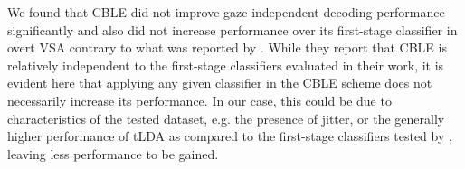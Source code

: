 

We found that CBLE did not improve gaze-independent decoding performance
significantly and also did not increase performance over its first-stage
classifier in overt VSA contrary to what was reported
by \cite{Mowla2017}.
While they report that CBLE is relatively independent to the
first-stage classifiers evaluated in their work, it is evident here that
applying any given classifier in the CBLE scheme does not necessarily increase
its performance.
In our case, this could be due to characteristics of the tested dataset, e.g.
the presence of jitter, or the generally higher performance of tLDA as compared to the
first-stage classifiers tested by \cite{Mowla2017}, leaving less
performance to be gained.


